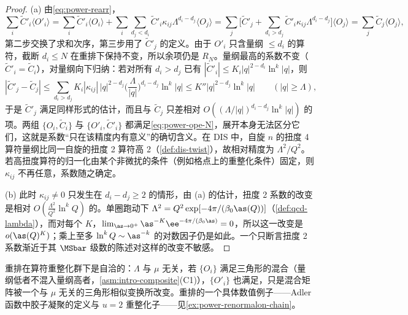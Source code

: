 \begin{proof}
(a) 由\eqref{eq:power-rearr}，
\begin{equation*}
\sum_i\tilde C'_i\langle O'_i\rangle=\sum_i\tilde C'_i\langle O_i\rangle+\sum_i\sum_{d_j<d_i}\tilde C'_i\kappa_{ij}\Lambda^{d_i-d_j}\langle O_j\rangle
=\sum_j\Big[\tilde C'_j+\sum_{d_i>d_j}\tilde C'_i\kappa_{ij}\Lambda^{d_i-d_j}\Big]\langle O_j\rangle=\sum_j\tilde C_j\langle O_j\rangle ,
\end{equation*}
第二步交换了求和次序，第三步用了 $\tilde C'_j$ 的定义。由于 $O'_i$ 只含量纲 $\le d_i$ 的算符，截断 $d_i\le N$ 在重排下保持不变，所以余项仍是 $R_N$。量纲最高的系数不变（$\tilde C'_i=\tilde C_i$），对量纲向下归纳：若对所有 $d_i>d_j$ 已有 $|\tilde C'_i|\le K_i|q|^{2-d_i}\ln^k|q|$，则
\begin{equation*}
|\tilde C'_j-\tilde C_j|\le\sum_{d_i>d_j}K_i|\kappa_{ij}|\,|q|^{2-d_j}\Big(\frac{\Lambda}{|q|}\Big)^{d_i-d_j}\ln^k|q|\le K''|q|^{2-d_j}\ln^k|q|\qquad(|q|\ge\Lambda),
\end{equation*}
于是 $\tilde C'_j$ 满足同样形式的估计，而且与 $\tilde C_j$ 只差相对 $O((\Lambda/|q|)^{d_i-d_j}\ln^k|q|)$ 的项。两组 $\{O_i,\tilde C_i\}$ 与 $\{O'_i,\tilde C'_i\}$ 都满足\eqref{eq:power-ope-N}，展开本身无法区分它们，这就是系数“只在该精度内有意义”的确切含义。在 DIS 中，自旋 $n$ 的扭度 4 算符量纲比同一自旋的扭度 2 算符高 2（\cref{def:dis-twist}），故相对精度为 $\Lambda^2/Q^2$。若高扭度算符的归一化由某个非微扰的条件（例如格点上的重整化条件）固定，则 $\kappa_{ij}$ 不再任意，系数随之确定。

(b) 此时 $\kappa_{ij}\ne0$ 只发生在 $d_i-d_j\ge2$ 的情形，由 (a) 的估计，扭度 2 系数的改变是相对 $O(\frac{\Lambda^2}{Q^2}\ln^kQ)$ 的。单圈跑动下 $\Lambda^2=Q^2\exp[-4\pi/(\beta_0\as(Q))]$（\cref{def:qcd-lambda}），而对每个 $K$，$\lim_{\as\to0^+}\as^{-K}\ee^{-4\pi/(\beta_0\as)}=0$，所以这一改变是 $o(\as(Q)^K)$；乘上至多 $\ln^kQ\sim\as^{-k}$ 的对数因子仍是如此。一个只断言扭度 2 系数渐近于其 $\MSbar$ 级数的陈述对这样的改变不敏感。
\end{proof}

重排在算符重整化群下是自洽的：$\Lambda$ 与 $\mu$ 无关，若 $\{O_i\}$ 满足三角形的混合（量纲低者不混入量纲高者，\cref{asm:intro-composite}(C1)），$\{O'_i\}$ 也满足，只是混合矩阵被一个与 $\mu$ 无关的三角形相似变换所改变。重排的一个具体数值例子——Adler 函数中胶子凝聚的定义与 $u=2$ 重整化子——见\cref{ex:power-renormalon-chain}。


